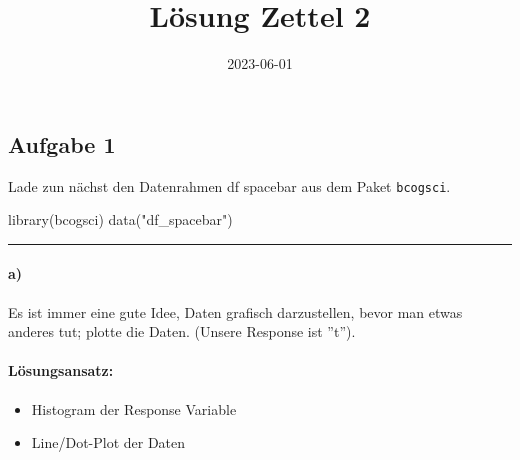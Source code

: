 \documentclass[
]{article}
\title{Lösung Zettel 2}
\author{}
\date{\vspace{-2.5em}2023-06-01}
\newenvironment{Shaded}{\begin{snugshade}}{\end{snugshade}}
\newcommand{\AttributeTok}[1]{\textcolor[rgb]{0.77,0.63,0.00}{#1}}
\newcommand{\CommentTok}[1]{\textcolor[rgb]{0.56,0.35,0.01}{\textit{#1}}}
\newcommand{\DecValTok}[1]{\textcolor[rgb]{0.00,0.00,0.81}{#1}}
\newcommand{\FunctionTok}[1]{\textcolor[rgb]{0.00,0.00,0.00}{#1}}
\newcommand{\NormalTok}[1]{#1}
\newcommand{\SpecialCharTok}[1]{\textcolor[rgb]{0.00,0.00,0.00}{#1}}
\newcommand{\StringTok}[1]{\textcolor[rgb]{0.31,0.60,0.02}{#1}}
\providecommand{\tightlist}{%
  \setlength{\itemsep}{0pt}\setlength{\parskip}{0pt}}
\begin{document}
\maketitle

\hypertarget{aufgabe-1}{%
\subsection{Aufgabe 1}\label{aufgabe-1}}

Lade zun nächst den Datenrahmen df spacebar aus dem Paket
\texttt{bcogsci}.

\begin{Shaded}
\begin{Highlighting}[]
\FunctionTok{library}\NormalTok{(bcogsci)}
\FunctionTok{data}\NormalTok{(}\StringTok{"df\_spacebar"}\NormalTok{)}
\end{Highlighting}
\end{Shaded}

\begin{center}\rule{0.5\linewidth}{0.5pt}\end{center}

\hypertarget{a}{%
\paragraph{a)}\label{a}}

Es ist immer eine gute Idee, Daten grafisch darzustellen, bevor man
etwas anderes tut; plotte die Daten. (Unsere Response ist ''t'').

\hypertarget{luxf6sungsansatz}{%
\paragraph{Lösungsansatz:}\label{luxf6sungsansatz}}

\begin{itemize}
\tightlist
\item
  Histogram der Response Variable
\item
  Line/Dot-Plot der Daten
\end{itemize}

\begin{Shaded}
\end{Shaded}
\end{document}
